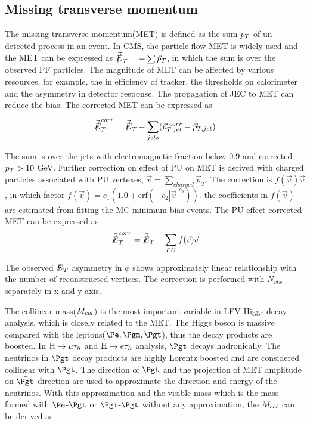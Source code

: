 \subsection{Missing transverse momentum}
The missing transverse momentum(MET) is defined as the sum $p_{T}$ of un-detected process in an event. In CMS, the particle flow MET is widely used and the MET can be expressed as $\vec{\slashed{E}}_{T}=-\sum \vec{p}_{T}$, in which the sum is over the observed PF particles. The magnitude of MET can be affected by various resources, for example, the in efficiency of tracker, the thresholds on calorimeter and the asymmetry in detector response. The propagation of JEC to MET can reduce the bias. The corrected MET can be expressed as
  
\begin{align*}
\vec{\slashed{E}}_{T}^{corr}=\vec{\slashed{E}}_{T}-\sum_{jets}(\vec{p}_{T,jet}^{~corr}-\vec{p}_{T,jet})
\end{align*}

The sum is over the jets with electromagnetic fraction below 0.9 and corrected $p_{T}>10$ GeV. Further correction on effect of PU on MET is derived with charged particles associated with PU vertexes, $\vec{v}=\sum_{charged}\vec{p}_{T}$. The correction is $f(\vec{v})\vec{v}$, in which factor $f(\vec{v})=c_{1}(1.0+\textrm{erf}(-c_{2}|\vec{v}|^{c_{3}}))$. the coefficients in $f(\vec{v})$ are estimated from fitting the MC minimum bias events. The PU effect corrected MET can be expressed as 
\begin{align*}
\vec{\slashed{E}}_{T}^{corr}=\vec{\slashed{E}}_{T}-\sum_{PU}f(\vec{v})\vec{v}
\end{align*}

The observed $\slashed{E}_{T}$ asymmetry in $\phi$ shows approximately linear relationship with the number of reconstructed vertices. The correction is performed with $N_{vtx}$ separately in x and y axis. 

The collinear-mass($M_{col}$) is the most important variable in LFV Higgs decay analysis, which is closely related to the MET. The Higgs boson is massive compared with the leptons($\Pe,\Pgm,\Pgt$), thus the decay products are boosted. In $\mathrm{H}\to \mu\tau_{h}$ and $\mathrm{H} \to e \tau_{h}$ analysis, $\Pgt$ decays hadronically. The neutrinos in $\Pgt$ decay products are highly Lorentz boosted and are considered collinear with $\Pgt$. The direction of $\Pgt$ and the projection of MET amplitude on $\vec{\Pgt}$ direction are used to approximate the direction and energy of the neutrinos. With this approximation and the visible mass which is the mass formed with $\Pe$-$\Pgt$ or $\Pgm$-$\Pgt$ without any approximation, the $M_{col}$ can be derived as

